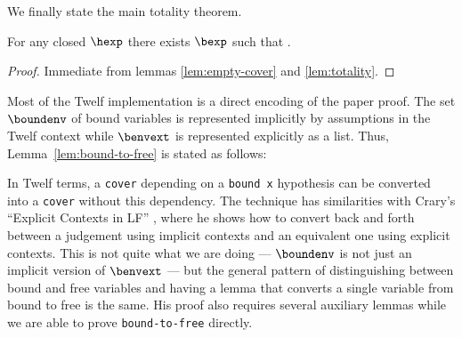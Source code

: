 We finally state the main totality theorem.

\begin{theorem}
For any closed $\hexp$ there exists $\bexp$ such that \trahb{}{\envnil}{\bexp}{\hexp}.
\end{theorem}


\begin{proof}
Immediate from lemmas \ref{lem:empty-cover} and \ref{lem:totality}.
\end{proof}

\Twelf
Most of the Twelf implementation is a direct encoding of the paper proof.
The set $\boundenv$ of bound variables is represented implicitly by assumptions in the Twelf context while $\benvext$ is represented explicitly as a list.
Thus, Lemma~\ref{lem:bound-to-free} is stated as follows:

In Twelf terms, a \texttt{cover} depending on a \texttt{bound x} hypothesis can be converted into a \texttt{cover} without this dependency.
The technique has similarities with Crary's ``Explicit Contexts in LF'' \cite{Crary08}, where he shows how to convert back and forth between a judgement using implicit contexts and an equivalent one using explicit contexts.
This is not quite what we are doing --- $\boundenv$ is not just an implicit version of $\benvext$ --- but the general pattern of distinguishing between bound and free variables and having a lemma that converts a single variable from bound to free is the same.
His proof also requires several auxiliary lemmas while we are able to prove \texttt{bound-to-free} directly.

